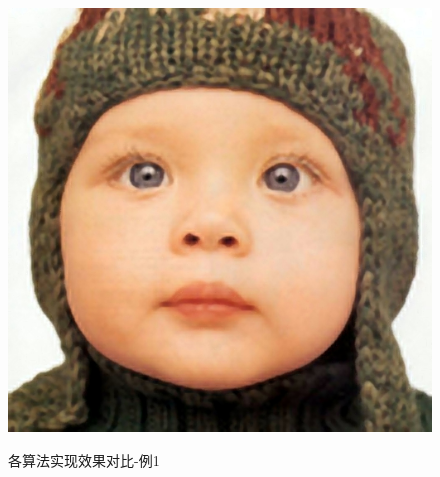 \documentclass[12pt, a4paper, oneside]{ctexbook}
\begin{document}
\begin{figure}[h]
{			\includegraphics[scale=0.35]{./pic/lbp-raisr-1.png}
		}
		\caption{各算法实现效果对比-例1}
	\end{figure}
\end{document}
